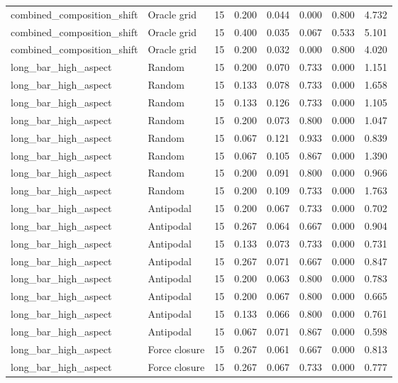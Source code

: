 {\begin{longtable}{llrrrrrr}
combined\_composition\_shift & Oracle grid & 15 & 0.200 & 0.044 & 0.000 & 0.800 & 4.732 \\
combined\_composition\_shift & Oracle grid & 15 & 0.400 & 0.035 & 0.067 & 0.533 & 5.101 \\
combined\_composition\_shift & Oracle grid & 15 & 0.200 & 0.032 & 0.000 & 0.800 & 4.020 \\
long\_bar\_high\_aspect & Random & 15 & 0.200 & 0.070 & 0.733 & 0.000 & 1.151 \\
long\_bar\_high\_aspect & Random & 15 & 0.133 & 0.078 & 0.733 & 0.000 & 1.658 \\
long\_bar\_high\_aspect & Random & 15 & 0.133 & 0.126 & 0.733 & 0.000 & 1.105 \\
long\_bar\_high\_aspect & Random & 15 & 0.200 & 0.073 & 0.800 & 0.000 & 1.047 \\
long\_bar\_high\_aspect & Random & 15 & 0.067 & 0.121 & 0.933 & 0.000 & 0.839 \\
long\_bar\_high\_aspect & Random & 15 & 0.067 & 0.105 & 0.867 & 0.000 & 1.390 \\
long\_bar\_high\_aspect & Random & 15 & 0.200 & 0.091 & 0.800 & 0.000 & 0.966 \\
long\_bar\_high\_aspect & Random & 15 & 0.200 & 0.109 & 0.733 & 0.000 & 1.763 \\
long\_bar\_high\_aspect & Antipodal & 15 & 0.200 & 0.067 & 0.733 & 0.000 & 0.702 \\
long\_bar\_high\_aspect & Antipodal & 15 & 0.267 & 0.064 & 0.667 & 0.000 & 0.904 \\
long\_bar\_high\_aspect & Antipodal & 15 & 0.133 & 0.073 & 0.733 & 0.000 & 0.731 \\
long\_bar\_high\_aspect & Antipodal & 15 & 0.267 & 0.071 & 0.667 & 0.000 & 0.847 \\
long\_bar\_high\_aspect & Antipodal & 15 & 0.200 & 0.063 & 0.800 & 0.000 & 0.783 \\
long\_bar\_high\_aspect & Antipodal & 15 & 0.200 & 0.067 & 0.800 & 0.000 & 0.665 \\
long\_bar\_high\_aspect & Antipodal & 15 & 0.133 & 0.066 & 0.800 & 0.000 & 0.761 \\
long\_bar\_high\_aspect & Antipodal & 15 & 0.067 & 0.071 & 0.867 & 0.000 & 0.598 \\
long\_bar\_high\_aspect & Force closure & 15 & 0.267 & 0.061 & 0.667 & 0.000 & 0.813 \\
long\_bar\_high\_aspect & Force closure & 15 & 0.267 & 0.067 & 0.733 & 0.000 & 0.777 \\

\end{longtable}}
